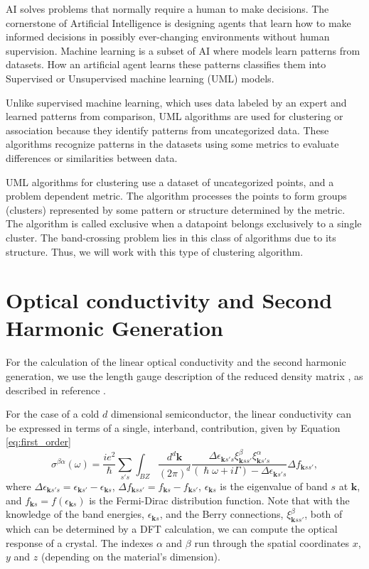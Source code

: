 \documentclass[a4paper,12pt]{report}
\begin{document}
AI solves problems that normally require a human to make decisions.
The cornerstone of Artificial Intelligence is designing agents that learn how to make informed decisions in possibly ever-changing environments without human supervision. Machine learning is a subset of AI where models learn patterns from datasets.
How an artificial agent learns these patterns classifies them into Supervised or Unsupervised machine learning (UML) models.

Unlike supervised machine learning, which uses data labeled by an expert and learned patterns from comparison, UML algorithms are used for clustering or association because they identify patterns from uncategorized data.
These algorithms recognize patterns in the datasets using some metrics to evaluate differences or similarities between data.

UML algorithms for clustering use a dataset of uncategorized points, and a  problem dependent metric.
The algorithm processes the points to form groups (clusters) represented by some pattern or structure determined by the metric.
The algorithm is called exclusive when a datapoint belongs exclusively to a single cluster.
The band-crossing problem lies in this class of algorithms due to its structure.
Thus, we will work with this type of clustering algorithm.


\section{Optical conductivity and Second Harmonic Generation}

For the calculation of the linear optical conductivity and the second harmonic generation,
we use the length gauge description of the reduced density matrix \cite{Sipe1995,Sipe2000,Ventura2017},
as described in reference \cite{Ventura2017}.

For the case of a cold $d$ dimensional semiconductor, the linear conductivity can be expressed in terms of a single, interband, contribution,
 given by Equation \ref{eq:first_order}
\begin{equation}\label{eq:first_order}
 \sigma^{\beta\alpha}(\omega) = \frac{i e^2}{\hslash}\sum_{s's}\int_{BZ}\frac{d^d\pmb{k}}{(2\pi)^d}
 \frac{\Delta\epsilon_{\pmb{k}s's} \xi_{\pmb{k}ss'}^{\beta}\xi_{\pmb{k}s's}^{\alpha}}{(\hslash\omega + i\Gamma)
 - \Delta\epsilon_{\pmb{k}s's}}\Delta f_{\pmb{k}ss'},
\end{equation}
where $\Delta\epsilon_{\pmb{k}s's} = \epsilon_{\pmb{k}s'} - \epsilon_{\pmb{k}s}$,
 $\Delta f_{\pmb{k}ss'} = f_{\pmb{k}s} - f_{\pmb{k}s'}$,
 $\epsilon_{\pmb{k}s}$ is the eigenvalue of band $s$ at $\pmb{k}$, and $f_{\pmb{k}s}=f(\epsilon_{\pmb{k}s})$ is the
Fermi-Dirac distribution function.
Note that with the knowledge of the band energies, $\epsilon_{\pmb{k}s}$,
and the Berry connections, $\xi_{\pmb{k}ss'}^{\beta}$, both of which can be determined by a DFT calculation,
we can compute the optical response of a crystal.
The indexes $\alpha$ and $\beta$ run through the spatial coordinates $x$, $y$ and $z$ (depending on the material's dimension).
\end{document}
